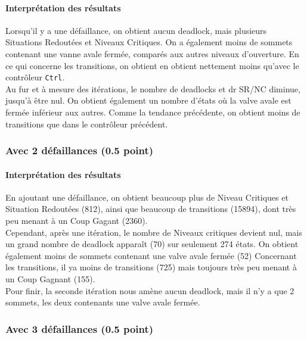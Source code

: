 \documentclass[a4paper]{book}
\begin{document}
\paragraph{Interprétation des résultats}
Lorsqu'il y a une défaillance, on obtient aucun deadlock, mais plusieurs Situations Redoutées et Niveaux Critiques. 
On a également moins de sommets contenant une vanne avale fermée, comparés aux autres niveaux d'ouverture. En ce qui concerne les 
transitions, on obtient en obtient nettement moins qu'avec le contrôleur {\tt Ctrl}. \\
Au fur et à mesure des itérations, le nombre de deadlocks et dr SR/NC diminue, jusqu'à être nul. On obtient également un nombre d'états où la valve avale est fermée
inférieur aux autres. Comme la tendance précédente, on obtient moins de transitions que dans le contrôleur précédent.

\subsubsection{Avec 2 défaillances (0.5 point)}




%
\paragraph{Interprétation des résultats}
En ajoutant une défaillance, on obtient beaucoup plus de Niveau Critiques et 
Situation Redoutées (812), ainsi que beaucoup de transitions (15894), dont très peu menant à un Coup Gagant (2360). \\
Cependant, après une itération, le nombre de Niveaux critiques devient nul, mais un grand nombre de deadlock apparaît (70)
sur seulement 274 états. On obtient également moins de sommets contenant une valve avale fermée (52)
Concernant les transitions, il ya moins de transitions (725) mais toujours très peu menant à un Coup Gagnant (155).\\
Pour finir, la seconde itération nous amène aucun deadlock, mais il n'y a que 2 sommets, les deux contenants une valve avale fermée.
\subsubsection{Avec 3 défaillances (0.5 point)}




%
\end{document}
